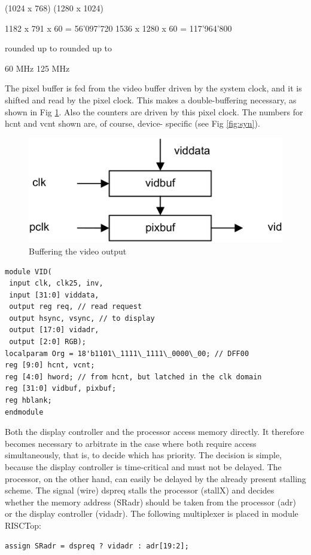 (1024 x 768)
(1280 x 1024)

1182 x 791 x 60 = 56'097'720
1536 x 1280 x 60 = 117'964'800

rounded up to
rounded up to

60 MHz
125 MHz

The pixel buffer is fed from the video buffer driven by the system clock, and it is shifted and read by
the pixel clock. This makes a double-buffering necessary, as shown in Fig \ref{fig:vo}. Also the
counters are driven by this pixel clock. The numbers for hcnt and vcnt shown are, of course, device-
specific (see Fig \ref{fig:syn}).
\begin{figure}[h!]
  \centering
  \includegraphics[width=.6\textwidth]{i/G/a.png}
  \caption{Buffering the video output}
  \label{fig:vo}
\end{figure}

\begin{verbatim}
module VID(
 input clk, clk25, inv,
 input [31:0] viddata,
 output reg req, // read request
 output hsync, vsync, // to display
 output [17:0] vidadr,
 output [2:0] RGB);
localparam Org = 18'b1101\_1111\_1111\_0000\_00; // DFF00
reg [9:0] hcnt, vcnt;
reg [4:0] hword; // from hcnt, but latched in the clk domain
reg [31:0] vidbuf, pixbuf;
reg hblank;
endmodule
\end{verbatim}

Both the display controller and the processor access memory directly. It therefore becomes
necessary to arbitrate in the case where both require access simultaneously, that is, to decide
which has priority. The decision is simple, because the display controller is time-critical and must
not be delayed. The processor, on the other hand, can easily be delayed by the already present
stalling scheme. The signal (wire) dspreq stalls the processor (stallX) and decides whether the
memory address (SRadr) should be taken from the processor (adr) or the display controller
(vidadr). The following multiplexer is placed in module RISCTop:

\begin{verbatim}
assign SRadr = dspreq ? vidadr : adr[19:2];
\end{verbatim}

